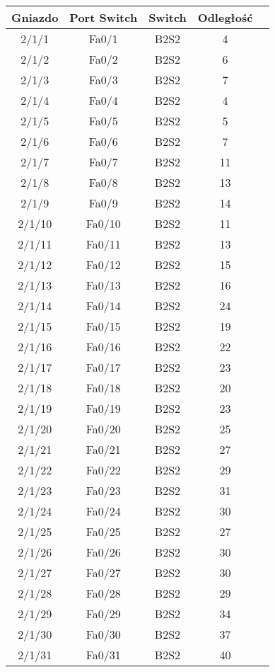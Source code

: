 \begin{center}
    \begin{longtable}{|c|c|c|c|c|}
    \hline
    Gniazdo & Port Switch & Switch & Odległość \\ \hline
	2/1/1 & Fa0/1 & B2S2 & 4 \\ \hline
	2/1/2 & Fa0/2 & B2S2 & 6 \\ \hline
	2/1/3 & Fa0/3 & B2S2 & 7 \\ \hline
	2/1/4 & Fa0/4 & B2S2 & 4 \\ \hline
	2/1/5 & Fa0/5 & B2S2 & 5 \\ \hline
	2/1/6 & Fa0/6 & B2S2 & 7 \\ \hline
	2/1/7 & Fa0/7 & B2S2 & 11 \\ \hline
	2/1/8 & Fa0/8 & B2S2 & 13 \\ \hline
	2/1/9 & Fa0/9 & B2S2 & 14 \\ \hline
	2/1/10 & Fa0/10 & B2S2 & 11 \\ \hline
	2/1/11 & Fa0/11 & B2S2 & 13 \\ \hline
	2/1/12 & Fa0/12 & B2S2 & 15 \\ \hline
	2/1/13 & Fa0/13 & B2S2 & 16 \\ \hline
	2/1/14 & Fa0/14 & B2S2 & 24 \\ \hline
	2/1/15 & Fa0/15 & B2S2 & 19 \\ \hline
	2/1/16 & Fa0/16 & B2S2 & 22 \\ \hline
	2/1/17 & Fa0/17 & B2S2 & 23 \\ \hline
	2/1/18 & Fa0/18 & B2S2 & 20 \\ \hline
	2/1/19 & Fa0/19 & B2S2 & 23 \\ \hline
	2/1/20 & Fa0/20 & B2S2 & 25 \\ \hline
	2/1/21 & Fa0/21 & B2S2 & 27 \\ \hline
	2/1/22 & Fa0/22 & B2S2 & 29 \\ \hline
	2/1/23 & Fa0/23 & B2S2 & 31 \\ \hline
	2/1/24 & Fa0/24 & B2S2 & 30 \\ \hline
	2/1/25 & Fa0/25 & B2S2 & 27 \\ \hline
	2/1/26 & Fa0/26 & B2S2 & 30 \\ \hline
	2/1/27 & Fa0/27 & B2S2 & 30 \\ \hline
	2/1/28 & Fa0/28 & B2S2 & 29 \\ \hline
	2/1/29 & Fa0/29 & B2S2 & 34 \\ \hline
	2/1/30 & Fa0/30 & B2S2 & 37 \\ \hline
	2/1/31 & Fa0/31 & B2S2 & 40 \\ \hline

\end{longtable}
\end{center}
